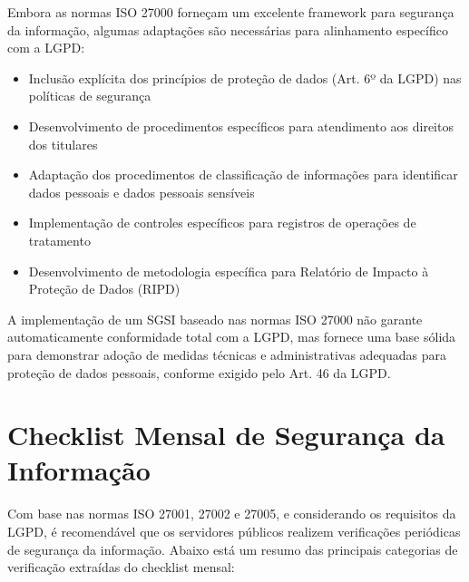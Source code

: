 \documentclass[12pt,a4paper]{report}
\begin{document}
Embora as normas ISO 27000 forneçam um excelente framework para segurança da informação, algumas adaptações são necessárias para alinhamento específico com a LGPD:

\begin{itemize}
  \item Inclusão explícita dos princípios de proteção de dados (Art. 6º da LGPD) nas políticas de segurança
  \item Desenvolvimento de procedimentos específicos para atendimento aos direitos dos titulares
  \item Adaptação dos procedimentos de classificação de informações para identificar dados pessoais e dados pessoais sensíveis
  \item Implementação de controles específicos para registros de operações de tratamento
  \item Desenvolvimento de metodologia específica para Relatório de Impacto à Proteção de Dados (RIPD)
\end{itemize}

\begin{infobox}
A implementação de um SGSI baseado nas normas ISO 27000 não garante automaticamente conformidade total com a LGPD, mas fornece uma base sólida para demonstrar adoção de medidas técnicas e administrativas adequadas para proteção de dados pessoais, conforme exigido pelo Art. 46 da LGPD.
\end{infobox}

\section{Checklist Mensal de Segurança da Informação}

Com base nas normas ISO 27001, 27002 e 27005, e considerando os requisitos da LGPD, é recomendável que os servidores públicos realizem verificações periódicas de segurança da informação. Abaixo está um resumo das principais categorias de verificação extraídas do checklist mensal:
\end{document}
